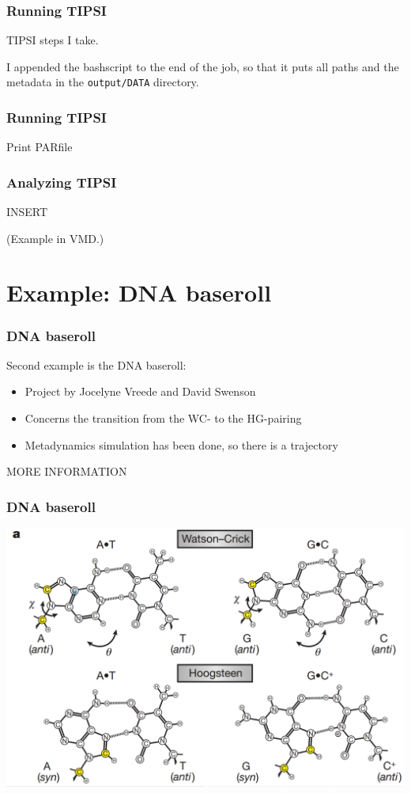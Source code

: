 \documentclass[hyperref={pdfpagelabels=false}]{beamer}
\begin{document}
\begin{frame}
\frametitle{Running \textsc{TIPSI}} 

TIPSI steps I take.

I appended the bashscript to the end of the job, so that it puts all paths and the metadata in the \texttt{output/DATA} directory.
\end{frame}

\begin{frame}
\frametitle{Running \textsc{TIPSI}} 

Print PARfile

\end{frame}

\begin{frame}
\frametitle{Analyzing \textsc{TIPSI}}
INSERT

(Example in VMD.) 
\end{frame}

\section{Example: DNA baseroll}
\setcounter{subsection}{1}


\begin{frame}
\frametitle{DNA baseroll} 
Second example is the DNA baseroll:
\begin{itemize}
\item Project by Jocelyne Vreede and David Swenson
\item Concerns the transition from the WC- to the HG-pairing
\item Metadynamics simulation has been done, so there is a trajectory
\end{itemize}
MORE INFORMATION
\end{frame}

\begin{frame}
\frametitle{DNA baseroll} 
\begin{center}
\includegraphics[scale=0.2]{images/pairing.png}
\end{center}
\end{frame}
\end{document}
